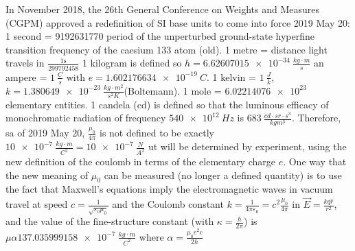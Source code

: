 In November 2018, the 26th General Conference on Weights and Measures (CGPM) approved a redefinition of SI base units to come into force 2019 May 20:
1 second = 9192631770 period of the unperturbed ground-state hyperfine transition frequency of the caesium 133 atom (old).
 1 metre = distance light travels in $\frac{1 \text{s}}{299792458}$ 1 kilogram is defined so $h =\SI{6.62607015e-34}{\frac{kg \cdot m}{s}}$ an ampere = $\SI{1}{\frac{C}{s}}$ with $e = \SI{1.602176634e-19}{C}$.
1 kelvin = $\SI{1}{\frac{J}{k}}$, $k = \SI{1.380649e-23}{\frac{kg \cdot m^2}{s^2 K}}$(Boltemann). 
1 mole = $\SI{6.02214076e23}{}$ elementary entities. 
1 candela (cd) is defined so that the luminous efficacy of monochromatic radiation of frequency $\SI{540e12}{Hz}$ is $\SI{683}{\frac{cd \cdot sr \cdot s^3}{kg m^3}}$.
Therefore, sa of 2019 May 20, $\frac{\mu_0}{4\pi}$ is not defined to be exactly $\SI{10e-7}{\frac{kg \cdot m}{C^2}} = \SI{10e-7}{\frac{N}{A^2}}$ ut will be determined by experiment, using the new definition of the coulomb in terms of the elementary charge $e$.
One way that the new meaning of $\mu_0$ can be measured (no longer a defined quantity) is to use the fact that Maxwell's equations imply the electromagnetic waves in vacuum travel at speed $c= \frac{1}{\sqrt{\varepsilon_0\mu_0}}$ and the Coulomb constant $k = \frac{1}{4 \pi \varepsilon_0} = c^2 \frac{\mu_0}{4\pi}$ in $\vec{E} = \frac{kq \hat{r}}{r^2}$, and the value of the fine-structure constant (with $\kappa = \frac{h}{2 \pi}$) is $\mu \alpha \SI{137.035999158e-7}{\frac{kg \cdot m}{C^2}}$ where $\alpha = \frac{\mu_0e^2c}{2h}$
